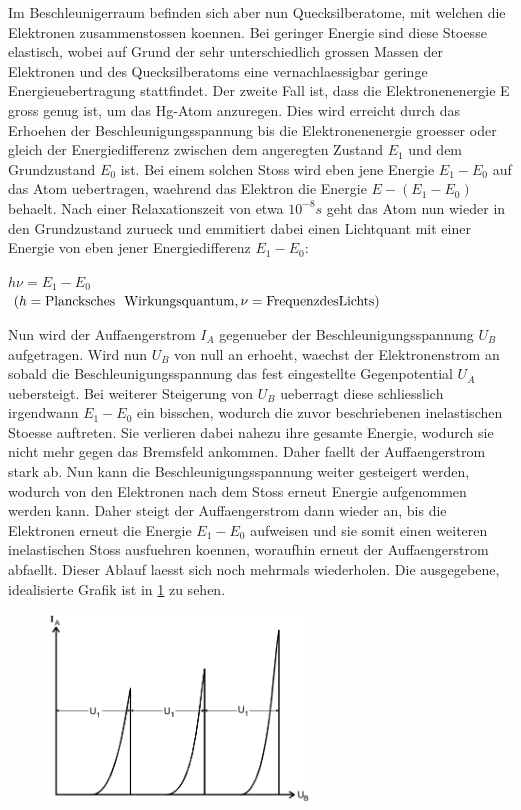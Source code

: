 Im Beschleunigerraum befinden sich aber nun Quecksilberatome, mit welchen die Elektronen zusammenstossen koennen. Bei geringer Energie sind diese Stoesse elastisch, wobei auf Grund der sehr unterschiedlich grossen Massen der Elektronen und des Quecksilberatoms eine vernachlaessigbar geringe Energieuebertragung stattfindet.
\newpage \noindent Der zweite Fall ist, dass die Elektronenenergie E gross genug ist, um das Hg-Atom anzuregen. Dies wird erreicht durch das Erhoehen der Beschleunigungsspannung bis die Elektronenenergie groesser oder gleich der Energiedifferenz zwischen dem angeregten Zustand $E_1$ und dem Grundzustand $E_0$ ist. Bei einem solchen Stoss wird eben jene Energie $E_1-E_0$ auf das Atom uebertragen, waehrend das Elektron die Energie $E-(E_1-E_0)$ behaelt. Nach einer Relaxationszeit von etwa $10^{-8}s$ geht das Atom nun wieder in den Grundzustand zurueck und emmitiert dabei einen Lichtquant mit einer Energie von eben jener Energiedifferenz $E_1-E_0$:
   \begin{center}
    $h\nu=E_1-E_0 \nonumber$\\
    $(h=\text{Plancksches \space Wirkungsquantum}, \nu=\text{Frequenz} \space \text{des} \space \text{Lichts})\nonumber$
   \end{center}
Nun wird der Auffaengerstrom $I_A$ gegenueber der Beschleunigungsspannung $U_B$ aufgetragen. Wird nun $U_B$ von null an erhoeht, waechst der Elektronenstrom an sobald die Beschleunigungsspannung das fest eingestellte Gegenpotential $U_A$ uebersteigt. Bei weiterer Steigerung von $U_B$ ueberragt diese schliesslich irgendwann $E_1-E_0$ ein bisschen, wodurch die zuvor beschriebenen inelastischen Stoesse auftreten. Sie verlieren dabei nahezu ihre gesamte Energie, wodurch sie nicht mehr gegen das Bremsfeld ankommen. Daher faellt der Auffaengerstrom stark ab. Nun kann die Beschleunigungsspannung weiter gesteigert werden, wodurch von den Elektronen nach dem Stoss erneut Energie aufgenommen werden kann. Daher steigt der Auffaengerstrom dann wieder an, bis die Elektronen erneut die Energie $E_1-E_0$ aufweisen und sie somit einen weiteren inelastischen Stoss ausfuehren koennen, woraufhin erneut der Auffaengerstrom abfaellt. Dieser Ablauf laesst sich noch mehrmals wiederholen. Die ausgegebene, idealisierte Grafik ist in \ref{Fig:Ideal} zu sehen.
\begin{figure}[H]
    \centering
    \captionsetup{justification=centering}
    \includegraphics[height=5cm]{"Ideal_FranckHertz.png"}
    \label{Fig:Ideal}
\end{figure}
